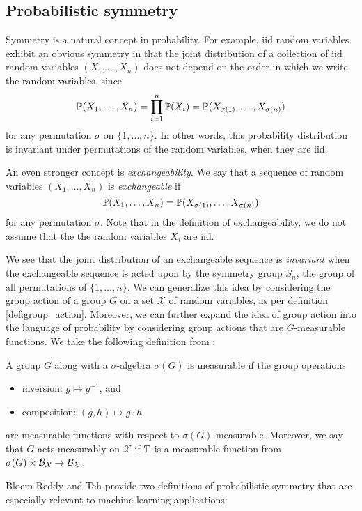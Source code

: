 \subsection{Probabilistic symmetry}
Symmetry is a natural concept in probability.
For example, iid random variables exhibit an obvious symmetry in that the joint distribution of a collection of iid random variables $(X_1,\ldots,X_n)$ does not depend on the order in which we write the random variables, since
$$
 \mathbb{P}(X_1,\ldots,X_n) = \prod_{i=1}^n \mathbb{P}(X_i) = \mathbb{P}(X_{\sigma(1)},\ldots,X_{\sigma(n)})
$$
for any permutation $\sigma$ on $\{1,\ldots,n\}$.
In other words, this probability distribution is invariant under permutations of the random variables, when they are iid.

An even stronger concept is \textit{exchangeability}.
We say that a sequence of random variables $(X_1,\ldots,X_n)$ is \textit{exchangeable} if
$$
	\mathbb{P}(X_1,\ldots,X_n) = \mathbb{P}(X_{\sigma(1)},\ldots,X_{\sigma(n)})
$$
for any permutation $\sigma$.
Note that in the definition of exchangeability, we do not assume that the the random variables $X_i$ are iid.

We see that the joint distribution of an exchangeable sequence is \textit{invariant} when the exchangeable sequence is acted upon by the symmetry group $S_n$, the group of all permutations of $\{1,\ldots,n\}$.
We can generalize this idea by considering the group action of a group $G$ on a set $\mathcal{X}$ of random variables, as per definition \ref{def:group_action}.
Moreover, we can further expand the idea of group action into the language of probability by considering group actions that are $G$-measurable functions.
We take the following definition from \cite{bloemreddy2019probabilistic}:
\begin{definition}
	A group $G$ along with a $\sigma$-algebra $\sigma(G)$ is measurable if the group operations
	\begin{itemize}
		\item inversion: $g \mapsto g^{-1}$, and
		\item composition: $(g,h) \mapsto g \cdot h$
	\end{itemize}
	are measurable functions with respect to $\sigma(G)$-measurable.
	Moreover, we say that $G$ acts measurably on $\mathcal{X}$ if $\mathbb{T}$ is a measurable function from $\sigma(G) \times \mathcal{B}_{\mathcal{X}} \to \mathcal{B}_{\mathcal{X}}$.
\end{definition}

Bloem-Reddy and Teh \cite{bloemreddy2019probabilistic} provide two definitions of probabilistic symmetry that are especially relevant to machine learning applications:

